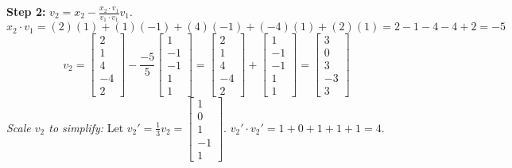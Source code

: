 \documentclass[11pt, letterpaper]{article}
\theoremstyle{definition}
\theoremstyle{remark}
\begin{document}
\textbf{Step 2:} $v_2 = x_2 - \frac{x_2 \cdot v_1}{v_1 \cdot v_1}v_1$.
\[ x_2 \cdot v_1 = (2)(1) + (1)(-1) + (4)(-1) + (-4)(1) + (2)(1) = 2 - 1 - 4 - 4 + 2 = -5 \]
\[ v_2 = \begin{bmatrix} 2 \\ 1 \\ 4 \\ -4 \\ 2 \end{bmatrix} - \frac{-5}{5} \begin{bmatrix} 1 \\ -1 \\ -1 \\ 1 \\ 1 \end{bmatrix} = \begin{bmatrix} 2 \\ 1 \\ 4 \\ -4 \\ 2 \end{bmatrix} + \begin{bmatrix} 1 \\ -1 \\ -1 \\ 1 \\ 1 \end{bmatrix} = \begin{bmatrix} 3 \\ 0 \\ 3 \\ -3 \\ 3 \end{bmatrix} \]
\textit{Scale $v_2$ to simplify:} Let $v_2' = \frac{1}{3}v_2 = \begin{bmatrix} 1 \\ 0 \\ 1 \\ -1 \\ 1 \end{bmatrix}$. $v_2' \cdot v_2' = 1 + 0 + 1 + 1 + 1 = 4$.
\end{document}

